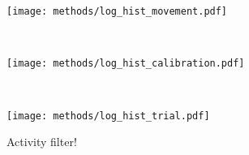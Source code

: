 \documentclass[../main.tex]{subfiles}
\begin{document}

\begin{figure}[tph]
  \begin{minipage}[b]{\linewidth}
    \centering
    \texttt{[image: methods/log\_hist\_movement.pdf]}
    \subcaption{}
    \vspace{4ex}
  \end{minipage}\\
  \begin{minipage}[b]{\linewidth}
    \centering
    \texttt{[image: methods/log\_hist\_calibration.pdf]}
    \subcaption{}
    \vspace{4ex}
  \end{minipage}\\
  \begin{minipage}[b]{\linewidth}
    \centering
    \texttt{[image: methods/log\_hist\_trial.pdf]}
    \subcaption{}
    \vspace{4ex}
  \end{minipage}
  \caption[Log transforming EMG]{Activity filter!}\label{fig:log_hist}
\end{figure}

\end{document}
